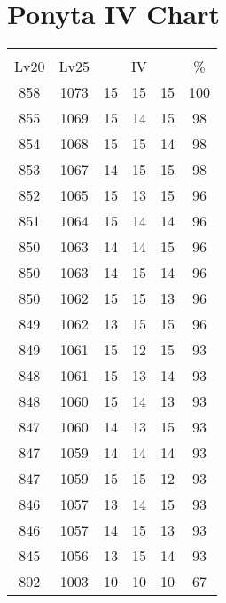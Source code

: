 \documentclass{article}%
\begin{document}
%
\normalsize%
\section{Ponyta IV Chart}%
\label{sec:Ponyta IV Chart}%
\renewcommand{\arraystretch}{1.5}%
\begin{tabular}{|c|c|c|c|c|c|}%
\hline%
\multicolumn{6}{|c|}{\textcolor{white}{ 
\linebreak{Ponyta}
}%
\cellcolor{black}}\\%
\multicolumn{1}{|c}{Lv20}&\multicolumn{1}{c|}{Lv25}&\multicolumn{3}{c|}{IV}&\multicolumn{1}{|c|}{\%}\\%
\hline%
\rowcolor{color100}%
858&1073&15&15&15&100\\%
\hline%
\rowcolor{color98}%
855&1069&15&14&15&98\\%
\hline%
\rowcolor{color98}%
854&1068&15&15&14&98\\%
\hline%
\rowcolor{color98}%
853&1067&14&15&15&98\\%
\hline%
\rowcolor{color96}%
852&1065&15&13&15&96\\%
\hline%
\rowcolor{color96}%
851&1064&15&14&14&96\\%
\hline%
\rowcolor{color96}%
850&1063&14&14&15&96\\%
\hline%
\rowcolor{color96}%
850&1063&14&15&14&96\\%
\hline%
\rowcolor{color96}%
850&1062&15&15&13&96\\%
\hline%
\rowcolor{color96}%
849&1062&13&15&15&96\\%
\hline%
\rowcolor{color93}%
849&1061&15&12&15&93\\%
\hline%
\rowcolor{color93}%
848&1061&15&13&14&93\\%
\hline%
\rowcolor{color93}%
848&1060&15&14&13&93\\%
\hline%
\rowcolor{color93}%
847&1060&14&13&15&93\\%
\hline%
\rowcolor{color93}%
847&1059&14&14&14&93\\%
\hline%
\rowcolor{color93}%
847&1059&15&15&12&93\\%
\hline%
\rowcolor{color93}%
846&1057&13&14&15&93\\%
\hline%
\rowcolor{color93}%
846&1057&14&15&13&93\\%
\hline%
\rowcolor{color93}%
845&1056&13&15&14&93\\%
\hline%
\rowcolor{color91}%
802&1003&10&10&10&67\\%
\end{tabular}

%
\end{document}
